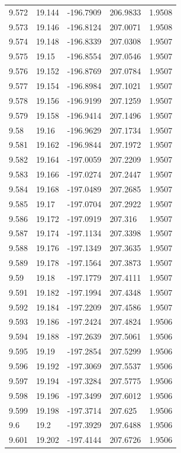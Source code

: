 \begin{tabular}{lllll}
9.572 & 19.144 & -196.7909 & 206.9833 & 1.9508 \\
9.573 & 19.146 & -196.8124 & 207.0071 & 1.9508 \\
9.574 & 19.148 & -196.8339 & 207.0308 & 1.9507 \\
9.575 & 19.15 & -196.8554 & 207.0546 & 1.9507 \\
9.576 & 19.152 & -196.8769 & 207.0784 & 1.9507 \\
9.577 & 19.154 & -196.8984 & 207.1021 & 1.9507 \\
9.578 & 19.156 & -196.9199 & 207.1259 & 1.9507 \\
9.579 & 19.158 & -196.9414 & 207.1496 & 1.9507 \\
9.58 & 19.16 & -196.9629 & 207.1734 & 1.9507 \\
9.581 & 19.162 & -196.9844 & 207.1972 & 1.9507 \\
9.582 & 19.164 & -197.0059 & 207.2209 & 1.9507 \\
9.583 & 19.166 & -197.0274 & 207.2447 & 1.9507 \\
9.584 & 19.168 & -197.0489 & 207.2685 & 1.9507 \\
9.585 & 19.17 & -197.0704 & 207.2922 & 1.9507 \\
9.586 & 19.172 & -197.0919 & 207.316 & 1.9507 \\
9.587 & 19.174 & -197.1134 & 207.3398 & 1.9507 \\
9.588 & 19.176 & -197.1349 & 207.3635 & 1.9507 \\
9.589 & 19.178 & -197.1564 & 207.3873 & 1.9507 \\
9.59 & 19.18 & -197.1779 & 207.4111 & 1.9507 \\
9.591 & 19.182 & -197.1994 & 207.4348 & 1.9507 \\
9.592 & 19.184 & -197.2209 & 207.4586 & 1.9507 \\
9.593 & 19.186 & -197.2424 & 207.4824 & 1.9506 \\
9.594 & 19.188 & -197.2639 & 207.5061 & 1.9506 \\
9.595 & 19.19 & -197.2854 & 207.5299 & 1.9506 \\
9.596 & 19.192 & -197.3069 & 207.5537 & 1.9506 \\
9.597 & 19.194 & -197.3284 & 207.5775 & 1.9506 \\
9.598 & 19.196 & -197.3499 & 207.6012 & 1.9506 \\
9.599 & 19.198 & -197.3714 & 207.625 & 1.9506 \\
9.6 & 19.2 & -197.3929 & 207.6488 & 1.9506 \\
9.601 & 19.202 & -197.4144 & 207.6726 & 1.9506 \\

\end{tabular}
